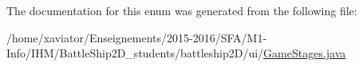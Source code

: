 The documentation for this enum was generated from the following file\-:\begin{DoxyCompactItemize}
\item 
/home/xaviator/\-Enseignements/2015-\/2016/\-S\-F\-A/\-M1-\/\-Info/\-I\-H\-M/\-Battle\-Ship2\-D\-\_\-students/battleship2\-D/ui/\hyperlink{GameStages_8java}{Game\-Stages.\-java}\end{DoxyCompactItemize}
